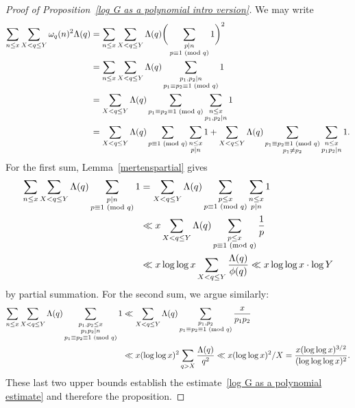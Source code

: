\documentclass[12pt,reqno]{amsart}
\theoremstyle{definition}
\renewcommand{\mod}[1]{{\ifmmode\text{\rm\ (mod~$#1$)}\else\discretionary{}{}{\hbox{ }}\rm(mod~$#1$)\fi}}
\begin{document}
\begin{proof}[Proof of Proposition~\ref{log G as a polynomial intro version}]
We may write
\begin{align*}
\sum_{n \leq x} \sum_{X < q \leq Y} \omega_q(n)^2 \Lambda(q) &= \sum_{n \leq x} \sum_{X < q \leq Y} \Lambda(q) \bigg( \sum_{\substack{p \mid n \\ p \equiv 1 \mod q}} 1 \bigg)^2 \\
&= \sum_{n \leq x} \sum_{X < q \leq Y} \Lambda(q) \sum_{\substack{p_1,p_2 \mid n \\ p_1 \equiv p_2 \equiv 1 \mod q}} 1 \\
&= \sum_{X < q \leq Y} \Lambda(q) \sum_{\substack{p_1 \equiv p_2 \equiv 1 \mod q}} \sum_{\substack{n \leq x \\ p_1,p_2 \mid n}} 1 \\
&= \sum_{X < q \leq Y} \Lambda(q) \sum_{\substack{p \equiv 1 \mod q}} \sum_{\substack{n \leq x \\ p \mid n}} 1 +  \sum_{X < q \leq Y} \Lambda(q) \sum_{\substack{p_1 \equiv p_2 \equiv 1 \mod q \\ p_1\ne p_2}} \sum_{\substack{n \leq x \\ p_1p_2 \mid n}} 1.
\end{align*}
For the first sum, Lemma~\ref{mertenspartial} gives
\begin{align*}
\sum_{n \leq x} \sum_{X < q \leq Y} \Lambda(q) \sum_{\substack{p \mid n \\ p \equiv 1 \mod q}} 1 &= \sum_{X < q \leq Y} \Lambda(q) \sum_{\substack{p \leq x \\ p \equiv 1 \mod q}} \sum_{\substack{n \leq x \\ p \mid n}} 1 \\
&\ll x \sum_{X < q \leq Y} \Lambda(q) \sum_{\substack{p \leq x \\ p \equiv 1 \mod q}} \frac{1}{p} \\
&\ll x\log\log x \sum_{X < q \leq Y} \frac{\Lambda(q)}{\phi(q)} \ll x\log\log x\cdot \log Y
\end{align*}
by partial summation. For the second sum, we argue similarly:
\begin{align*}
\sum_{n \leq x} \sum_{X < q \leq Y} \Lambda(q) \sum_{\substack{p_1, p_2 \leq x \\ p_1p_2 \mid n \\ p_1 \equiv p_2 \equiv 1 \mod q}} 1 &\ll \sum_{X < q \leq Y} \Lambda(q) \sum_{\substack{p_1, p_2 \\ p_1 \equiv p_2 \equiv 1 \mod q}} \frac{x}{p_1p_2} \\
&\ll x(\log\log x)^2 \sum_{q > X} \frac{\Lambda(q)}{q^2} \ll x(\log\log x)^{2}/X = \frac{x(\log\log x)^{3/2}}{(\log\log\log x)^2}.
\end{align*}
These last two upper bounds establish the estimate~\eqref{log G as a polynomial estimate} and therefore the proposition.
\end{proof}
\end{document}
